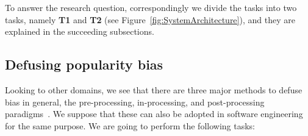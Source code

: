 To answer the research question, correspondingly we divide the tasks into two tasks, namely \textbf{T1} and \textbf{T2} (see Figure~\ref{fig:SystemArchitecture}), and they are explained in the succeeding subsections.


\subsection{Defusing popularity bias}

Looking to other domains, we see that there are three major methods to defuse bias in general, \ie the pre-processing, in-processing, and post-processing paradigms~\cite{doi:10.1089/big.2016.0048}. We suppose that these can also be adopted in software engineering for the same purpose. %
We are going to perform the following tasks:

